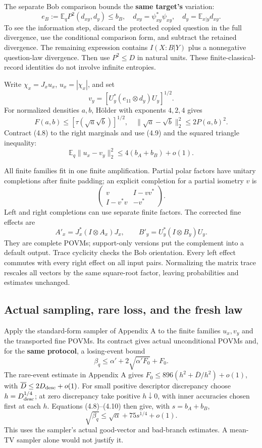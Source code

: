 \documentclass[11pt,reqno]{amsart}
\numberwithin{equation}{section}
\begin{document}
The separate Bob comparison bounds the \textbf{same target's} variation: \[
 e_B:=\mathbb E_q P^2(d_{xy},d_y)\le b_B,
\quad d_{xy}=\psi_{xy}^*\psi_{xy},\quad
 d_y=\mathbb E_{x|y}d_{xy}. \tag{4.9}
\] To see the information step, discard the protected copied question in the full divergence, use the conditional comparison form, and subtract the retained divergence. The remaining expression contains \(I(X:B|Y)\) plus a nonnegative question-law divergence. Then use \(P^2\le D\) in natural units. These finite-classical-record identities do not involve infinite entropies.

Write \(\chi_x=J_xu_x\), \(u_x=|\chi_x|\), and set \[
 v_y=[U_y^*(e_{11}\otimes d_y)U_y]^{1/2}.
\] For normalized densities \(a,b\), Hölder with exponents \(4,2,4\) gives \[
 F(a,b)\le[\tau(\sqrt a\sqrt b)]^{1/2},\quad
 \|\sqrt a-\sqrt b\|_2^2\le2P(a,b)^2.
\] Contract (4.8) to the right marginals and use (4.9) and the squared triangle inequality: \[
 \mathbb E_q\|u_x-v_y\|_2^2\le4(b_A+b_B)+o(1). \tag{4.10}
\]

All finite families fit in one finite amplification. Partial polar factors have unitary completions after finite padding; an explicit completion for a partial isometry \(v\) is \[
 \begin{pmatrix}v&I-vv^*\\I-v^*v&-v^*\end{pmatrix}.
\] Left and right completions can use separate finite factors. The corrected fine effects are \[
 A'_x=J_x^*(I\otimes A_x)J_x,\qquad
 B'_y=U_y^*(I\otimes B_y)U_y. \tag{4.11}
\] They are complete POVMs; support-only versions put the complement into a default output. Trace cyclicity checks the Bob orientation. Every left effect commutes with every right effect on all input pairs. Normalizing the matrix trace rescales all vectors by the same square-root factor, leaving probabilities and estimates unchanged.

\subsection{Actual sampling, rare loss, and the fresh law}\label{actual-sampling-rare-loss-and-the-fresh-law}

Apply the standard-form sampler of Appendix A to the finite families \(u_x,v_y\) and the transported fine POVMs. Its contract gives actual unconditional POVMs and, for the \textbf{same protocol}, a losing-event bound \[
 \beta_q\le\alpha'+2\sqrt{\alpha'F_0}+F_0.
\] The rare-event estimate in Appendix A gives \(F_0\le896(h^2+\overline D/h^2)+o(1)\), with \(\overline D\le2D_{\rm desc}+o(1)\). For small positive descriptor discrepancy choose \(h=D_{\rm desc}^{1/4}\); at zero discrepancy take positive \(h\downarrow0\), with inner accuracies chosen first at each \(h\). Equations (4.8)--(4.10) then give, with \(s=b_A+b_B\), \[
 \sqrt{\beta_q}\le\sqrt\alpha+75s^{1/4}+o(1). \tag{4.12}
\] This uses the sampler's actual good-vector and bad-branch estimates. A mean-TV sampler alone would not justify it.
\end{document}
